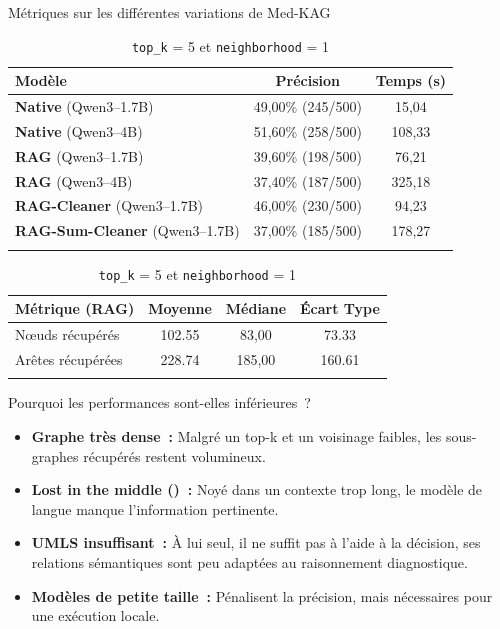 \begin{frame}[c]{Métriques sur les différentes variations de Med-KAG}
  \begin{table}
    \centering{}

    \begin{tabular}{lcc}
      \toprule{}
      \textbf{Modèle} & \textbf{Précision} & \textbf{Temps (s)} \\
      \midrule

      \textbf{Native} (Qwen3--1.7B)          & 49,00\% (245/500) & 15,04 \\
      \textbf{Native} (Qwen3--4B)            & 51,60\% (258/500) & 108,33 \\
      \midrule

      \textbf{RAG} (Qwen3--1.7B)             & 39,60\% (198/500) & 76,21 \\
      \textbf{RAG} (Qwen3--4B)               & 37,40\% (187/500) & 325,18 \\
      \textbf{RAG-Cleaner} (Qwen3--1.7B)     & 46,00\% (230/500) & 94,23 \\
      \textbf{RAG-Sum-Cleaner} (Qwen3--1.7B) & 37,00\% (185/500) & 178,27 \\
      \bottomrule{}
    \end{tabular}
    \pause[]
    \vspace{-10px}
    \begin{tabular}{lccc}
      \toprule{}
      \textbf{Métrique (RAG)} & \textbf{Moyenne} & \textbf{Médiane} &
      \textbf{Écart Type} \\
      \midrule

      N\oe{}uds récupérés & 102.55 & 83,00 & 73.33 \\
      Arêtes récupérées & 228.74 & 185,00 & 160.61 \\
      \bottomrule{}
    \end{tabular}
    \caption{\texttt{top\_k} = 5 et \texttt{neighborhood} = 1}
  \end{table}
\end{frame}

\begin{frame}[c]{Pourquoi les performances sont-elles inférieures~?}
  \begin{itemize}
    \item<1-> \textbf{Graphe très dense~:} Malgré un top-k et un voisinage
      faibles, les sous-graphes récupérés restent volumineux.
      \vspace{10px}
    \item<2-> \textbf{Lost in the middle (\cite{liu-etal-2024-lost})~:} Noyé
      dans un contexte trop long, le modèle de langue manque l'information
      pertinente.
      \vspace{10px}
    \item<3-> \textbf{UMLS insuffisant~:} À lui seul, il ne suffit pas à
      l'aide à la décision, ses relations sémantiques sont peu adaptées au
      raisonnement diagnostique.
      \vspace{10px}
    \item<4-> \textbf{Modèles de petite taille~:} Pénalisent la précision,
      mais nécessaires pour une exécution locale.
  \end{itemize}
\end{frame}

